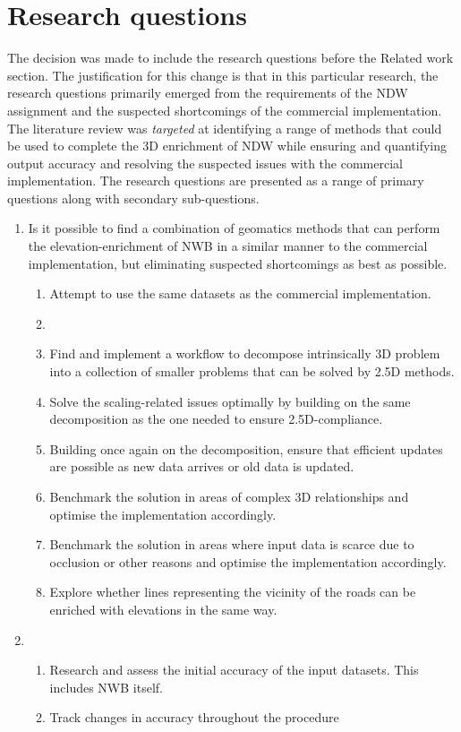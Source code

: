 
\chapter{Research questions}
\label{chap:rq}

The decision was made to include the research questions before the Related work section. The justification for this change is that in this particular research, the research questions primarily emerged from the requirements of the NDW assignment and the suspected shortcomings of the commercial implementation. The literature review was \textit{targeted} at identifying a range of methods that could be used to complete the 3D enrichment of NDW while ensuring and quantifying output accuracy and resolving the suspected issues with the commercial implementation. The research questions are presented as a range of primary questions along with secondary sub-questions.


\begin{enumerate}
\item Is it possible to find a combination of geomatics methods that can perform the elevation-enrichment of NWB in a similar manner to the commercial implementation, but eliminating suspected shortcomings as best as possible.
\begin{enumerate}
    \item Attempt to use the same datasets as the commercial implementation.
    \item
    \item Find and implement a workflow to decompose intrinsically 3D problem into a collection of smaller problems that can be solved by 2.5D methods.
    \item Solve the scaling-related issues optimally by building on the same decomposition as the one needed to ensure 2.5D-compliance.
    \item Building once again on the decomposition, ensure that efficient updates are possible as new data arrives or old data is updated.
    \item Benchmark the solution in areas of complex 3D relationships and optimise the implementation accordingly.
    \item Benchmark the solution in areas where input data is scarce due to occlusion or other reasons and optimise the implementation accordingly.
    \item Explore whether lines representing the vicinity of the roads can be enriched with elevations in the same way.
\end{enumerate}
\item 
\begin{enumerate}
\item Research and assess the initial accuracy of the input datasets. This includes NWB itself.
\item Track changes in accuracy throughout the procedure
\end{enumerate}
\end{enumerate}